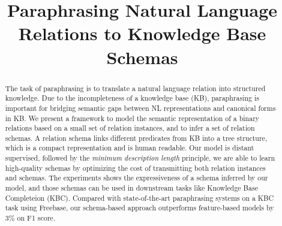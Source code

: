 \documentclass{article}
\title{Paraphrasing Natural Language Relations to Knowledge Base Schemas}
\begin{document}
\maketitle

\begin{abstract}
The task of paraphrasing is to translate a natural language relation into structured knowledge.
Due to the incompleteness of a knowledge base (KB), paraphrasing is important for
bridging semantic gaps between NL representations and canonical forms in KB.
We present a framework to model the semantic representation of a binary relations based on
a small set of relation instances, and to infer a set of relation schemas.
A relation schema links different predicates from KB into a tree structure, which is a compact representation and is human readable.
Our model is distant supervised, followed by the \textit{minimum description length} principle, 
we are able to learn high-quality schemas by optimizing the cost of transmitting both relation instances and schemas.
The experiments shows the expressiveness of a schema inferred by our model, and those schemas can be
used in downstream tasks like Knowledge Base Completeion (KBC). 
Compared with state-of-the-art paraphrasing systems on a KBC task using Freebase, 
our schema-based approach outperforms feature-based models by 3\% on F1 score.
\end{abstract}













\end{document}
